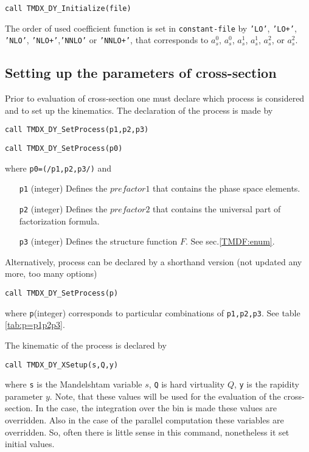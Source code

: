 \documentclass[prd,nofootinbib,eqsecnum,final]{revtex4}
\renewcommand{\(}{\left(}
\renewcommand{\)}{\right)}
\renewcommand{\[}{\left[}
\renewcommand{\]}{\right]}
\begin{document}
\texttt{call TMDX\_DY{\_}Initialize(file)}

The order of used coefficient function is set in \texttt{constant-file} by \texttt{'LO'}, \texttt{'LO+'}, \texttt{'NLO'}, \texttt{'NLO+'},\texttt{'NNLO'} or \texttt{'NNLO+'}, that corresponds to $a_s^0$, $a_s^0$, $a_s^1$, $a_s^1$, $a_s^2$, or $a_s^2$.

\subsection{Setting up the parameters of cross-section}
\label{TMDX:setup}

Prior to evaluation of cross-section one must declare which process is considered and to set up the kinematics. The declaration of the process is made by

\texttt{call TMDX\_DY{\_}SetProcess(p1,p2,p3)}

\texttt{call TMDX\_DY{\_}SetProcess(p0)}

where \texttt{p0=(/p1,p2,p3/)} and
\begin{itemize}
\item[\texttt{p1}] (integer) Defines the $prefactor1$ that contains the phase space elements.
\item[\texttt{p2}] (integer) Defines the $prefactor2$ that contains the universal part of factorization formula. 
\item[\texttt{p3}] (integer) Defines the structure function $F$. See sec.\ref{TMDF:enum}.
\end{itemize}

Alternatively, process can be declared by a shorthand version (not updated any more, too many options)

\texttt{call TMDX\_DY{\_}SetProcess(p)}

where \texttt{p}(integer) corresponds to particular combinations of \texttt{p1,p2,p3}. See table \ref{tab:p=p1p2p3}.

The kinematic of the process is declared by

\texttt{call TMDX\_DY{\_}XSetup(s,Q,y)}

where \texttt{s} is the Mandelshtam variable $s$, \texttt{Q} is hard virtuality $Q$, \texttt{y} is the rapidity parameter $y$. Note, that these values will be used for the evaluation of the cross-section. In the case, the integration over the bin is made these values are overridden. Also in the case of the parallel computation these variables are overridden. So, often there is little sense in this command, nonetheless it set initial values.
\end{document}
